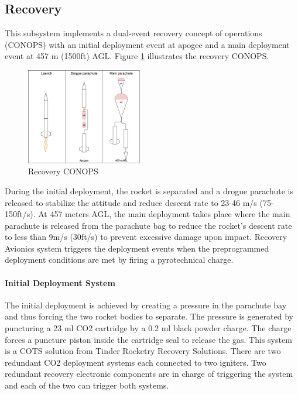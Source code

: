 \subsection{Recovery}
This subsystem implements a dual-event recovery concept of operations (CONOPS) with an initial deployment event at apogee and a main deployment event at 457 m (1500ft) AGL. Figure \ref{f:recovery_conops} illustrates the recovery CONOPS.
\begin{figure}[h!]
 	\centering
        \includegraphics[width=0.45\textwidth]{img/recovery_conops_schema.png}
        \caption{Recovery CONOPS}
        \label{f:recovery_conops}
 \end{figure}

During the initial deployment, the rocket is separated and a drogue parachute is released to stabilize the attitude and reduce descent rate to 23-46 m/s (75-150ft/s). At 457 meters AGL, the main deployment takes place where the main parachute is released from the parachute bag to reduce the rocket's descent rate to less than 9m/s (30ft/s) to prevent excessive damage upon impact. Recovery Avionics system triggers the deployment events when the preprogrammed deployment conditions are met by firing a pyrotechnical charge.

\paragraph{Initial Deployment System}
\hfill \break
The initial deployment is achieved by creating a pressure in the parachute bay and thus forcing the two rocket bodies to separate. The pressure is generated by puncturing a 23 ml CO2 cartridge by a 0.2 ml black powder charge. The charge forces a puncture piston inside the cartridge seal to release the gas. This system is a COTS solution from Tinder Rocketry Recovery Solutions.
There are two redundant CO2 deployment systems each connected to two igniters. Two redundant recovery electronic components are in charge of triggering the system and each of the two can trigger both systems.

